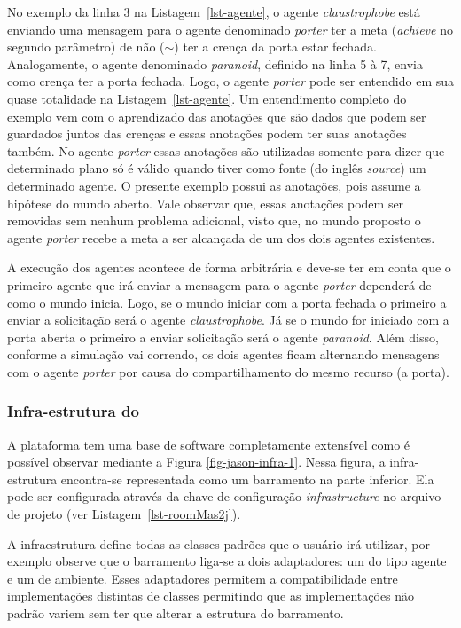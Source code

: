 No exemplo da linha 3 na Listagem~\ref{lst-agente}, o agente
\emph{claustrophobe} está enviando uma mensagem para o agente denominado \emph{porter}
ter a meta (\emph{achieve} no segundo parâmetro) de não ($\sim$) ter a crença
da porta estar fechada. Analogamente, o agente denominado \emph{paranoid}, definido
na linha 5 à 7, envia como crença ter a porta fechada. Logo, o agente \emph{porter} pode ser entendido
em sua quase totalidade na Listagem~\ref{lst-agente}. Um entendimento completo
do exemplo vem com o aprendizado das anotações que são dados que podem
ser guardados juntos das crenças e essas anotações podem ter suas anotações também.
No agente \emph{porter} essas anotações são utilizadas somente
para dizer que determinado plano só é válido quando tiver como fonte 
(do inglês \emph{source}) um determinado agente. O presente exemplo possui
as anotações, pois assume a hipótese do mundo aberto. Vale observar que, essas
anotações podem ser removidas sem nenhum problema adicional, visto que, no
mundo proposto o agente \emph{porter} recebe a meta a ser alcançada de um dos
dois agentes existentes.

A execução dos agentes acontece de forma arbitrária e deve-se ter em conta
que o primeiro agente que irá enviar a mensagem para o agente \emph{porter} dependerá
de como o mundo inicia. Logo, se o mundo iniciar com a porta fechada o primeiro
a enviar a solicitação será o agente \emph{claustrophobe}. Já se o mundo for iniciado
com a porta aberta o primeiro a enviar solicitação será o agente \emph{paranoid}.
Além disso, conforme a simulação vai correndo, os dois agentes ficam alternando
mensagens com o agente \emph{porter} por causa do compartilhamento do mesmo
recurso (a porta).

\subsubsection{Infra-estrutura do \jason} \label{sec-jason-architecture}

A plataforma \jason tem uma base de software completamente extensível como
é possível observar mediante a Figura \ref{fig-jason-infra-1}.
Nessa figura, a infra-estrutura encontra-se representada como um barramento
na parte inferior. Ela pode ser configurada através da chave de configuração
\emph{infrastructure} no arquivo de projeto (ver Listagem~\ref{lst-roomMas2j}).

A infraestrutura define todas as classes padrões que o usuário irá utilizar,
por exemplo observe que o barramento liga-se a dois adaptadores: um do tipo
agente e um de ambiente. Esses adaptadores permitem a compatibilidade entre
implementações distintas de classes permitindo que as implementações não
padrão variem sem ter que alterar a estrutura do barramento.

